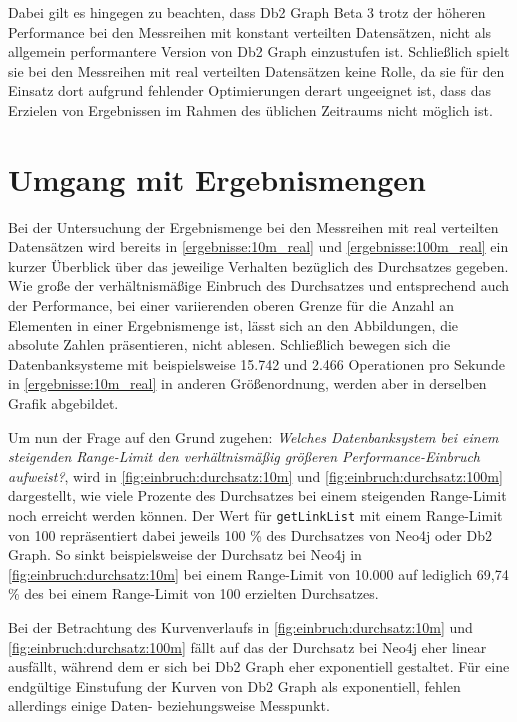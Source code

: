 Dabei gilt es hingegen zu beachten, dass Db2 Graph Beta 3 trotz der höheren Performance bei den Messreihen mit konstant verteilten Datensätzen, nicht als allgemein performantere Version von Db2 Graph einzustufen ist. Schließlich spielt sie bei den Messreihen mit real verteilten Datensätzen keine Rolle, da sie für den Einsatz dort aufgrund fehlender Optimierungen derart ungeeignet ist, dass das Erzielen von Ergebnissen im Rahmen des üblichen Zeitraums nicht möglich ist.

\section{Umgang mit Ergebnismengen}
\label{auswertung:ergebnismenge}
Bei der Untersuchung der Ergebnismenge bei den Messreihen mit real verteilten Datensätzen wird bereits in \autoref{ergebnisse:10m_real} und \autoref{ergebnisse:100m_real} ein kurzer Überblick über das jeweilige Verhalten bezüglich des Durchsatzes gegeben. Wie große der verhältnismäßige Einbruch des Durchsatzes und entsprechend auch der Performance, bei einer variierenden oberen Grenze für die Anzahl an Elementen in einer Ergebnismenge ist, lässt sich an den Abbildungen, die absolute Zahlen präsentieren, nicht ablesen. Schließlich bewegen sich die Datenbanksysteme mit beispielsweise 15.742 und 2.466 Operationen pro Sekunde in \autoref{ergebnisse:10m_real} in anderen Größenordnung, werden aber in derselben Grafik abgebildet. 

Um nun der Frage auf den Grund zugehen: \textit{Welches Datenbanksystem bei einem steigenden Range-Limit den verhältnismäßig größeren Performance-Einbruch aufweist?}, wird in \autoref{fig:einbruch:durchsatz:10m} und \autoref{fig:einbruch:durchsatz:100m} dargestellt, wie viele Prozente des Durchsatzes bei einem steigenden Range-Limit noch erreicht werden können. Der Wert für \texttt{getLinkList} mit einem Range-Limit von 100 repräsentiert dabei jeweils 100 \% des Durchsatzes von Neo4j oder Db2 Graph. So sinkt beispielsweise der Durchsatz bei Neo4j in \autoref{fig:einbruch:durchsatz:10m} bei einem Range-Limit von 10.000 auf lediglich 69,74 \% des bei einem Range-Limit von 100 erzielten Durchsatzes. 

Bei der Betrachtung des Kurvenverlaufs in \autoref{fig:einbruch:durchsatz:10m} und \autoref{fig:einbruch:durchsatz:100m} fällt auf das der Durchsatz bei Neo4j eher linear ausfällt, während  dem er sich bei Db2 Graph eher exponentiell gestaltet. Für eine endgültige Einstufung der Kurven von Db2 Graph als exponentiell, fehlen allerdings einige Daten- beziehungsweise Messpunkt.

